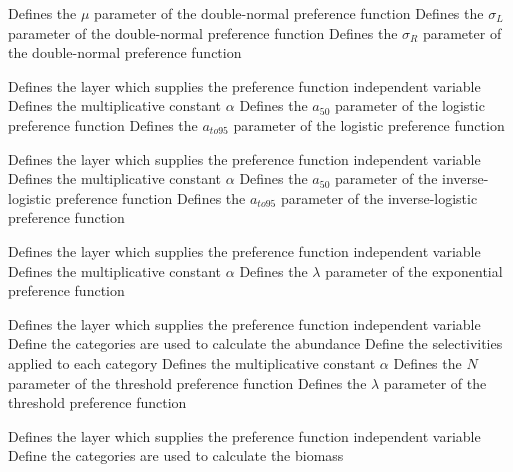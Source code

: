  {Defines the $\mu$ parameter of the double-normal preference function}
 {Defines the $\sigma_L$ parameter of the double-normal preference function}
 {Defines the $\sigma_R$ parameter of the double-normal preference function}
\par\textbf{}\par
{} {Defines the layer which supplies the preference function independent variable}
 {Defines the multiplicative constant $\alpha$}
 {Defines the $a_{50}$ parameter of the logistic preference function}
 {Defines the $a_{to95}$ parameter of the logistic preference function}
\par\textbf{}\par
{} {Defines the layer which supplies the preference function independent variable}
 {Defines the multiplicative constant $\alpha$}
 {Defines the $a_{50}$ parameter of the inverse-logistic preference function}
 {Defines the $a_{to95}$ parameter of the inverse-logistic preference function}
\par\textbf{}\par
{} {Defines the layer which supplies the preference function independent variable}
 {Defines the multiplicative constant $\alpha$}
 {Defines the $\lambda$ parameter of the exponential preference function}
\par\textbf{}\par
{} {Defines the layer which supplies the preference function independent variable}
 {Define the categories are used to calculate the abundance}
 {Define the selectivities applied to each category}
 {Defines the multiplicative constant $\alpha$}
 {Defines the $N$ parameter of the threshold preference function}
 {Defines the $\lambda$ parameter of the threshold preference function}
\par\textbf{}\par
{} {Defines the layer which supplies the preference function independent variable}
 {Define the categories are used to calculate the biomass}

